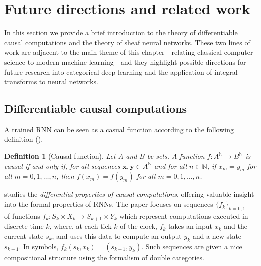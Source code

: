 \documentclass[11pt,a4paper,openright,twoside]{report}
\newcounter{mycounter}
\theoremstyle{plain}
\newtheorem{definition}[mycounter]{Definition}
\theoremstyle{definition}
\begin{document}
\section{Future directions and related work}

In this section we provide a brief introduction to the theory of differentiable causal computations and the theory of sheaf neural networks. These two lines of work are adjacent to the main theme of this chapter - relating classical computer science to modern machine learning - and they highlight possible directions for future research into categorical deep learning and the application of integral transforms to neural networks.

\subsection{Differentiable causal computations}

A trained RNN can be seen as a casual function according to the following definition (\cite{sprunger2019differentiable}).

\begin{definition}[Causal function]
  Let $A$ and $B$ be sets. A function $f: A^{\mathbb{N}} \to B^{\mathbb{N}}$ is causal if and only if, for all sequences $\mathbf{x}, \mathbf{y} \in A^{\mathbb{N}}$ and for all $n \in \mathbb{N}$, if $x_m = y_m$ for all $m = 0,1,\dots,n$, then $f(x_m) = f(y_m)$ for all $m = 0,1,\dots,n$.
\end{definition}

\cite{sprunger2019differentiable} studies the \textit{differential properties of causal computations}, offering valuable insight into the formal properties of RNNs. The paper focuses on sequences $\{f_k\}_{k=0,1,\dots}$ of functions $f_k: S_k \times X_k \to S_{k+1} \times Y_k$ which represent computations executed in discrete time $k$, where, at each tick $k$ of the clock, $f_k$ takes an input $x_k$ and the current state $s_k$, and uses this data to compute an output $y_k$ and a new state $s_{k+1}$. In symbols, $f_k(s_k,x_k) = (s_{k+1},y_k)$. Such sequences are given a nice compositional structure using the formalism of double categories.
\end{document}
